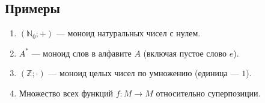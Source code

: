 \subsection*{Примеры}
\begin{enumerate}
    \item $(\mathbb{N}_0; +)$ — моноид натуральных чисел с нулем.
    \item $A^*$ — моноид слов в алфавите $A$ (включая пустое слово $e$).
    \item $(\mathbb{Z}; \cdot)$ — моноид целых чисел по умножению (единица — $1$).
    \item Множество всех функций $f: M \to M$ относительно суперпозиции.
\end{enumerate}